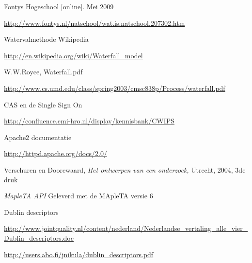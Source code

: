 
\begin{thebibliography}{99}

 Fontys Hogeschool [online]. Mei 2009
  
  \url{http://www.fontys.nl/natschool/wat.is.natschool.207302.htm}
 
   Watervalmethode Wikipedia
 
  \url{http://en.wikipedia.org/wiki/Waterfall_model}
  
  W.W.Royce, Waterfall.pdf 
  
  \url{http://www.cs.umd.edu/class/spring2003/cmsc838p/Process/waterfall.pdf}
  
   CAS en de Single Sign On
  
  \url{http://confluence.cmi-hro.nl/display/kennisbank/CWIPS}
  
   Apache2 documentatie
  
  \url{http://httpd.apache.org/docs/2.0/}
 
 Verschuren en Doorewaard, \emph{Het ontwerpen van
    een onderzoek}, Utrecht, 2004, 3de druk
  
   \emph{MapleTA API} Geleverd met de MApleTA versie 6
  
   Dublin descriptors
  
  \url{http://www.jointquality.nl/content/nederland/Nederlandse_vertaling_alle_vier_Dublin_descriptors.doc}

  \url{http://users.abo.fi/jnikula/dublin_descriptors.pdf}

\end{thebibliography}
